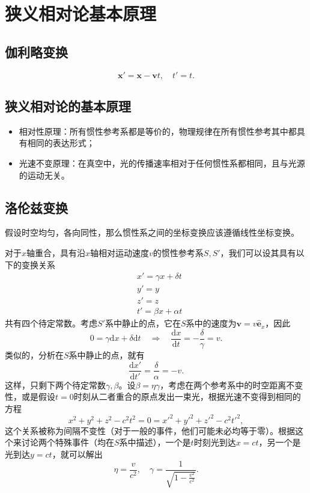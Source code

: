 \documentclass[UTF8]{ctexbook}
\renewcommand{\d}{\mathrm{d}}
\renewcommand{\b}{\boldsymbol}
\numberwithin{equation}{chapter}
\begin{document}
	\section{狭义相对论基本原理}
	
	\subsection{伽利略变换}
	\[\b{x}'=\b{x}-\b{v}t,\quad t'=t.\]
	
	\subsection{狭义相对论的基本原理}
	\begin{itemize}
		\item 相对性原理：所有惯性参考系都是等价的，物理规律在所有惯性参考其中都具有相同的表达形式；
		
		\item 光速不变原理：在真空中，光的传播速率相对于任何惯性系都相同，且与光源的运动无关。
	\end{itemize}

	\subsection{洛伦兹变换}
	假设时空均匀，各向同性，那么惯性系之间的坐标变换应该遵循线性坐标变换。
	\begin{figure}[H]
		\centering
	\end{figure}
	对于$x$轴重合，具有沿$x$轴相对运动速度$v$的惯性参考系$S,S'$，我们可以设其具有以下的变换关系
	\begin{align*}
		&x'=\gamma x+\delta t \\
		&y'=y \\
		&z'=z \\
		&t'=\beta x+\alpha t 
	\end{align*}
	共有四个待定常数。考虑$S'$系中静止的点，它在$S$系中的速度为$\b{v}=v\hat{\b{e}}_x$，因此
	\[0=\gamma\d x+\delta \d t \quad \Rightarrow \quad \frac{\d x}{\d t}=-\frac{\delta}{\gamma}=v.\]
	类似的，分析在$S$系中静止的点，就有
	\[\frac{\d x'}{\d t'}=\frac{\delta}{\alpha}=-v.\]
	这样，只剩下两个待定常数$\gamma,\beta$。设$\beta=\eta \gamma$，考虑在两个参考系中的时空距离不变性，或是假设$t=0$时刻从二者重合的原点发出一束光，根据光速不变得到相同的方程
	\[x^2+y^2+z^2-c^2t^2=0=x'^2+y'^2+z'^2-c^2t'^2,\]
	这个关系被称为间隔不变性（对于一般的事件，他们可能未必均等于零）。根据这个来讨论两个特殊事件（均在$S$系中描述），一个是$t$时刻光到达$x=ct$，另一个是光到达$y=ct$，就可以解出
	\[\eta=\frac{v}{c^2},\quad \gamma=\frac{1}{\sqrt{1-\frac{v^2}{c^2}}}.\]
	
\end{document}
